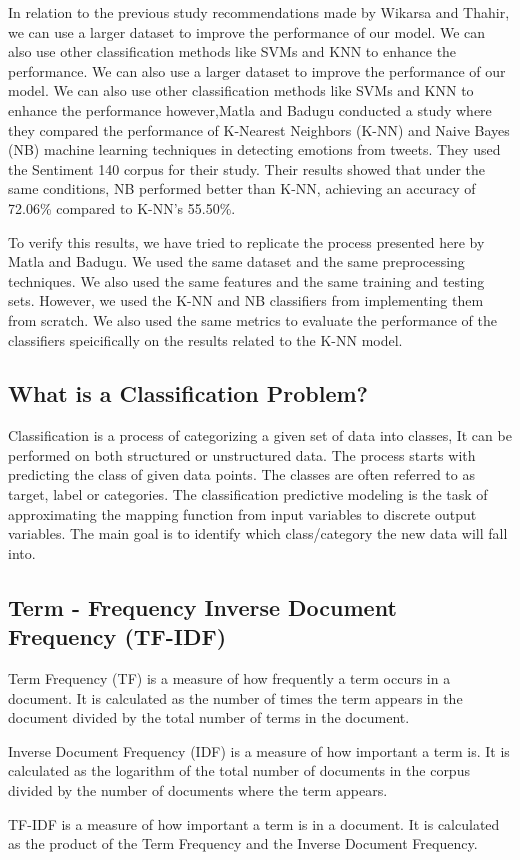 \documentclass[11pt]{article}
\begin{document}
\begin{multicols*}{2}
    \par In relation to the previous study recommendations made by Wikarsa and Thahir, we can use a larger dataset to improve the performance of our model. We can also use other classification methods like SVMs and KNN to enhance the performance. We can also use a larger dataset to improve the performance of our model. We can also use other classification methods like SVMs and KNN to enhance the performance however,Matla and Badugu conducted a study where they compared the performance of K-Nearest Neighbors (K-NN) and Naive Bayes (NB) machine learning techniques in detecting emotions from tweets. They used the Sentiment 140 corpus for their study. Their results showed that under the same conditions, NB performed better than K-NN, achieving an accuracy of 72.06\% compared to K-NN’s 55.50\%. \cite{suhasini2020emotion}
    \par To verify this results, we have tried to replicate the process presented here by Matla and Badugu. We used the same dataset and the same preprocessing techniques. We also used the same features and the same training and testing sets. However, we used the K-NN and NB classifiers from implementing them from scratch. We also used the same metrics to evaluate the performance of the classifiers speicifically on the results related to the K-NN model.
    \subsection*{What is a Classification Problem?}
    \par Classification is a process of categorizing a given set of data into classes, It can be performed on both structured or unstructured data. The process starts with predicting the class of given data points. The classes are often referred to as target, label or categories. The classification predictive modeling is the task of approximating the mapping function from input variables to discrete output variables. The main goal is to identify which class/category the new data will fall into.
    \subsection*{Term - Frequency Inverse Document Frequency (TF-IDF)}
    \par Term Frequency (TF) is a measure of how frequently a term occurs in a document. It is calculated as the number of times the term appears in the document divided by the total number of terms in the document.
    \par Inverse Document Frequency (IDF) is a measure of how important a term is. It is calculated as the logarithm of the total number of documents in the corpus divided by the number of documents where the term appears. 
    \par TF-IDF is a measure of how important a term is in a document. It is calculated as the product of the Term Frequency and the Inverse Document Frequency. 

\end{multicols*}
\end{document}
